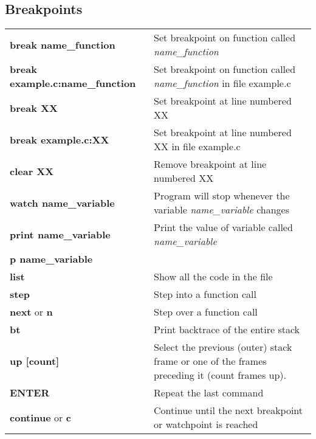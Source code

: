 \subsection{Breakpoints}
\begin{table}[h]
\footnotesize\centering
\begin{tabular}{|l|l|}
\hline
{\textbf{break name\_function}} & {Set breakpoint on function called \textit{name\_function}}\\
{\textbf{break example.c:name\_function}} & {Set breakpoint on function called \textit{name\_function} in file example.c}\\
\hline
{\textbf{break XX}} & {Set breakpoint at line numbered XX}\\
{\textbf{break example.c:XX}} & {Set breakpoint at line numbered XX in file example.c}\\
\hline
{\textbf{clear XX}} & {Remove breakpoint at line numbered XX}\\
\hline
{\textbf{watch name\_variable}} & {Program will stop whenever the variable \textit{name\_variable} changes}\\
\hline
{\textbf{print name\_variable}} & {Print the value of variable called \textit{name\_variable}}\\
{\textbf{p name\_variable}} & {}\\
\hline
{\textbf{list}}  & {Show all the code in the file}\\
\hline
{\textbf{step}} & {Step into a function call}\\
\hline
{\textbf{next} or \textbf{n}} & {Step over a function call}\\
\hline
{\textbf{bt}} & {Print backtrace of the entire stack}\\
\hline
{\textbf{up [count]}} & {Select the previous (outer) stack frame or one of the frames preceding it (count frames up).}\\
\hline
{\textbf{ENTER}} & {Repeat the last command}\\
\hline
{\textbf{continue} or \textbf{c}} & {Continue until the next breakpoint or watchpoint is reached}\\
\hline
\end{tabular}
\end{table}
